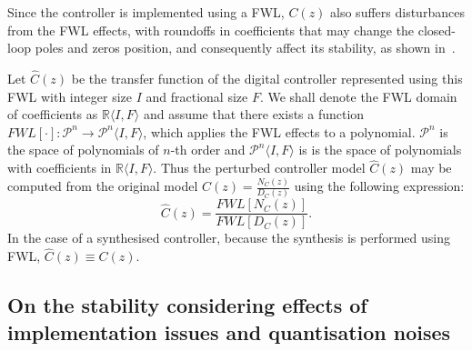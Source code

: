 \documentclass{sig-alternate-05-2015}
\newcommand{\red}[1]{{\color{red}#1}}
\begin{document}
Since the controller is implemented using a FWL, $C(z)$ also suffers disturbances from the FWL effects, with roundoffs in coefficients that may change the closed-loop poles and zeros position, and consequently affect its stability, as shown in~\cite{Bessa16}.


Let $\hat{C}(z)$ be the transfer function of the digital controller represented using this FWL with integer size $I$ and fractional
size $F$.  We shall denote the FWL domain of coefficients as $\mathbb{R}\langle I,F \rangle$
and assume that there exists a function $FWL[\cdot]:\mathcal{P}^{n}\rightarrow \mathcal{P}^{n}\langle I,F \rangle$, which applies the FWL effects to a polynomial. $\mathcal{P}^{n}$ is the space of polynomials of $n$-th order and $\mathcal{P}^{n}\langle I,F \rangle$ is is the space of polynomials with coefficients in $\mathbb{R}\langle I,F \rangle$.
Thus the perturbed controller model $\hat{C}(z)$ may be computed from the original model $C(z)=\frac{N_{C}(z)}{D_{C}(z)}$ using the following expression:
\begin{equation}
\hat{C}(z)=\frac{FWL[N_{C}(z)]}{FWL[D_{C}(z)]}.
\end{equation}
In the case of a synthesised controller, because the synthesis is performed using FWL, $\hat{C}(z) \equiv C(z)$. 

%

\subsection{On the stability considering effects of implementation issues and quantisation noises}
\label{sec:stability}
\end{document}
